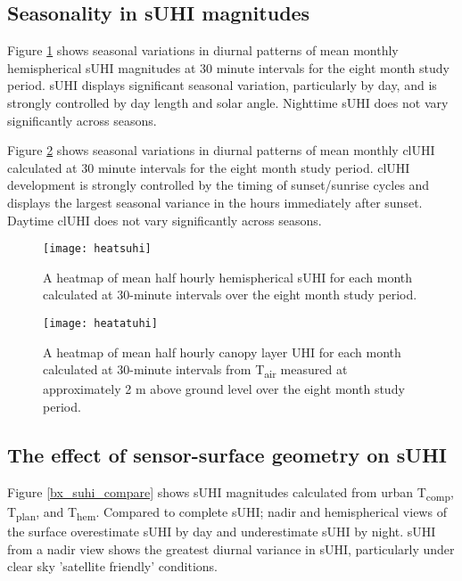 \subsection{Seasonality in sUHI magnitudes}

Figure \ref{heatsuhi} shows seasonal variations in diurnal patterns of mean monthly hemispherical sUHI magnitudes at 30 minute intervals for the eight month study period. sUHI displays significant seasonal variation, particularly by day, and is strongly controlled by day length and solar angle. Nighttime sUHI does not vary significantly across seasons. 

Figure \ref{heatcluhi} shows seasonal variations in diurnal patterns of mean monthly clUHI calculated at 30 minute intervals for the eight month study period. clUHI development is strongly controlled by the timing of sunset/sunrise cycles and displays the largest seasonal variance in the hours immediately after sunset. Daytime clUHI does not vary significantly across seasons. 
\begin{figure}[H]
	\centering
	\texttt{[image: heatsuhi]}
	\caption{A heatmap of mean half hourly hemispherical sUHI for each month calculated at 30-minute intervals over the eight month study period.}
	\label{heatsuhi}
\end{figure}

\begin{figure}[H]
	\centering
	\texttt{[image: heatatuhi]}
	\caption{A heatmap of mean half hourly canopy layer UHI for each month calculated at 30-minute intervals from T\textsubscript{air} measured at approximately 2 \si{\meter} above ground level over the eight month study period.}
	\label{heatcluhi}
\end{figure}

\subsection{The effect of sensor-surface geometry on sUHI}

Figure \ref{bx_suhi_compare} shows sUHI magnitudes calculated from urban T\textsubscript{comp}, T\textsubscript{plan}, and T\textsubscript{hem}. Compared to complete sUHI; nadir and hemispherical views of the surface overestimate sUHI by day and underestimate sUHI by night. sUHI from a nadir view shows the greatest diurnal variance in sUHI, particularly under clear sky 'satellite friendly' conditions. 

